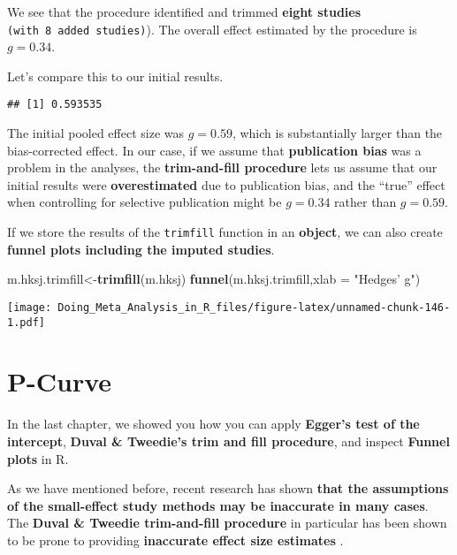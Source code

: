 \documentclass[]{book}
\newenvironment{Shaded}{\begin{snugshade}}{\end{snugshade}}
\newcommand{\KeywordTok}[1]{\textcolor[rgb]{0.13,0.29,0.53}{\textbf{#1}}}
\newcommand{\DataTypeTok}[1]{\textcolor[rgb]{0.13,0.29,0.53}{#1}}
\newcommand{\StringTok}[1]{\textcolor[rgb]{0.31,0.60,0.02}{#1}}
\newcommand{\OperatorTok}[1]{\textcolor[rgb]{0.81,0.36,0.00}{\textbf{#1}}}
\newcommand{\NormalTok}[1]{#1}
\theoremstyle{definition}
\theoremstyle{definition}
\theoremstyle{definition}
\theoremstyle{remark}
\begin{document}
We see that the procedure identified and trimmed \textbf{eight studies}
\texttt{(with\ 8\ added\ studies)}). The overall effect estimated by the
procedure is \(g = 0.34\).

Let's compare this to our initial results.

\begin{Shaded}
\end{Shaded}

\begin{verbatim}
## [1] 0.593535
\end{verbatim}

The initial pooled effect size was \(g = 0.59\), which is substantially
larger than the bias-corrected effect. In our case, if we assume that
\textbf{publication bias} was a problem in the analyses, the
\textbf{trim-and-fill procedure} lets us assume that our initial results
were \textbf{overestimated} due to publication bias, and the ``true''
effect when controlling for selective publication might be \(g = 0.34\)
rather than \(g = 0.59\).

If we store the results of the \texttt{trimfill} function in an
\textbf{object}, we can also create \textbf{funnel plots including the
imputed studies}.

\begin{Shaded}
\begin{Highlighting}[]
\NormalTok{m.hksj.trimfill<-}\KeywordTok{trimfill}\NormalTok{(m.hksj)}
\KeywordTok{funnel}\NormalTok{(m.hksj.trimfill,}\DataTypeTok{xlab =} \StringTok{"Hedges' g"}\NormalTok{)}
\end{Highlighting}
\end{Shaded}

\texttt{[image: Doing\_Meta\_Analysis\_in\_R\_files/figure-latex/unnamed-chunk-146-1.pdf]}

\hypertarget{pcurve}{\section{P-Curve}\label{pcurve}}

In the last chapter, we showed you how you can apply \textbf{Egger's
test of the intercept}, \textbf{Duval \& Tweedie's trim and fill
procedure}, and inspect \textbf{Funnel plots} in R.

As we have mentioned before, recent research has shown \textbf{that the
assumptions of the small-effect study methods may be inaccurate in many
cases}. The \textbf{Duval \& Tweedie trim-and-fill procedure} in
particular has been shown to be prone to providing \textbf{inaccurate
effect size estimates} \citep{simonsohn2014pb}.
\end{document}
